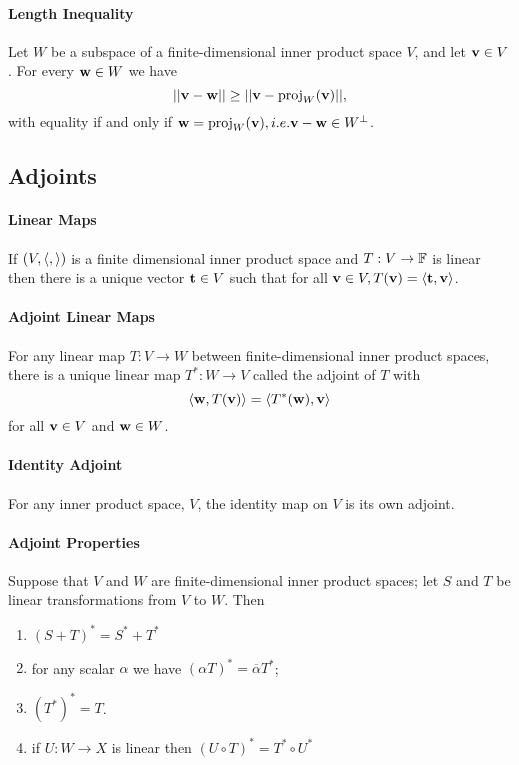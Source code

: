 \paragraph{Length Inequality}
Let \(W\) be a subspace of a finite-dimensional inner product space \(V\), and let \(\mathbf{v} \in V\). For every \(\mathbf{w} \in W\) we have
\[||\mathbf{v} - \mathbf{w}|| \geq ||\mathbf{v} - \mathrm{proj}_W(\mathbf{v})||,\]
with equality if and only if \(\mathbf{w} = \mathrm{proj}_W(\mathbf{v}), i.e. \mathbf{v} - \mathbf{w} \in W^\perp\).

\subsection{Adjoints}
\paragraph{Linear Maps}
If \((V, \langle ,  \rangle)\) is a finite dimensional inner product space and \(T:V \to \mathbb{F}\) is linear then there is a unique vector \(\mathbf{t} \in V\) such that for all \(\mathbf{v} \in V, T(\mathbf{v}) = \langle \mathbf{t}, \mathbf{v} \rangle\).

\paragraph{Adjoint Linear Maps}
For any linear map \(T: V \to W\) between finite-dimensional inner product spaces, there is a unique linear map \(T^*: W \to V\) called the adjoint of \(T\) with
\[\langle \mathbf{w}, T(\mathbf{v}) \rangle = \langle T^*(\mathbf{w}), \mathbf{v} \rangle\]
for all \(\mathbf{v} \in V\) and \(\mathbf{w} \in W\).

\paragraph{Identity Adjoint}
For any inner product space, \(V\), the identity map on \(V\) is its own adjoint.

\paragraph{Adjoint Properties}
Suppose that \(V\) and \(W\) are finite-dimensional inner product spaces; let \(S\) and \(T\) be linear transformations from \(V\) to \(W\). Then
\begin{enumerate}
    \item \((S + T)^* = S^* + T^*\)
    \item for any scalar \(\alpha\) we have \((\alpha T)^* = \overline{\alpha}T^*\);
    \item \((T^*)^* = T\).
    \item if \(U: W \to X\) is linear then \((U \circ T)^* = T^* \circ U^*\)
\end{enumerate}

